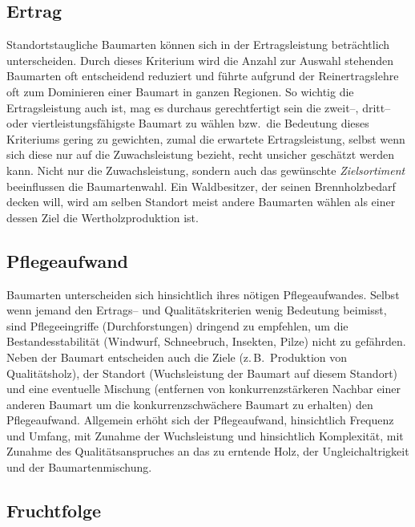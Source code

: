 \documentclass[twocolumn]{scrartcl}
\begin{document}
\subsection{Ertrag}
\label{ssec:ertrag}

Standortstaugliche Baumarten können sich in der Ertragsleistung
beträchtlich unterscheiden. Durch dieses Kriterium wird die Anzahl zur
Auswahl stehenden Baumarten oft entscheidend reduziert und führte
aufgrund der Reinertragslehre oft zum Dominieren einer Baumart in
ganzen Regionen. So wichtig die Ertragsleistung auch ist, mag es
durchaus gerechtfertigt sein die zweit--, dritt-- oder
viertleistungsfähigste Baumart zu wählen bzw.\ die Bedeutung dieses
Kriteriums gering zu gewichten, zumal die erwartete Ertragsleistung,
selbst wenn sich diese nur auf die Zuwachsleistung bezieht, recht
unsicher geschätzt werden kann. Nicht nur die Zuwachsleistung, sondern
auch das gewünschte \emph{Zielsortiment} beeinflussen die
Baumartenwahl. Ein Waldbesitzer, der seinen Brennholzbedarf decken
will, wird am selben Standort meist andere Baumarten wählen als einer
dessen Ziel die Wertholzproduktion ist.

\subsection{Pflegeaufwand}
\label{ssec:pflegeaufwand}

Baumarten unterscheiden sich hinsichtlich ihres nötigen
Pflegeaufwandes. Selbst wenn jemand den Ertrags-- und
Qualitätskriterien wenig Bedeutung beimisst, sind Pflegeeingriffe
(Durchforstungen) dringend zu empfehlen, um die Bestandesstabilität
(Windwurf, Schneebruch, Insekten, Pilze) nicht zu gefährden. Neben der
Baumart entscheiden auch die Ziele (z.\,B.\ Produktion von
Qualitätsholz), der Standort (Wuchsleistung der Baumart auf diesem
Standort) und eine eventuelle Mischung (entfernen von
konkurrenzstärkeren Nachbar einer anderen Baumart um die
konkurrenzschwächere Baumart zu erhalten) den Pflegeaufwand. Allgemein
erhöht sich der Pflegeaufwand, hinsichtlich Frequenz und Umfang, mit
Zunahme der Wuchsleistung und hinsichtlich Komplexität, mit Zunahme
des Qualitätsanspruches an das zu erntende Holz, der
Ungleichaltrigkeit und der Baumartenmischung.

\subsection{Fruchtfolge}
\label{ssec:Fruchtfolge}
\end{document}

